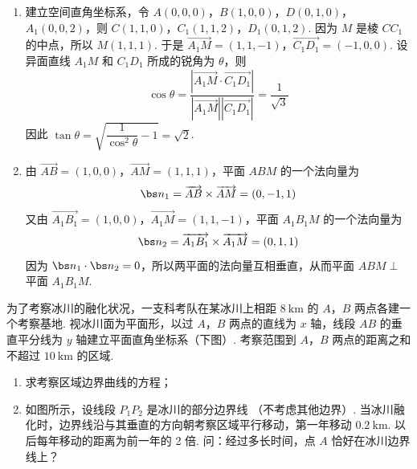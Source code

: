 \begin{solution}
\begin{enumerate}
\item 建立空间直角坐标系，令 \(A(0,0,0)\)，\(B(1,0,0)\)，\(D(0,1,0)\)，\(A_1(0,0,2)\)，则 \(C(1,1,0)\)，\(C_1(1,1,2)\)，\(D_1(0,1,2)\). 因为 \(M\) 是棱 \(CC_1\) 的中点，所以 \(M(1,1,1)\). 于是 \(\overrightarrow{A_1M}=(1,1,-1)\)，\(\overrightarrow{C_1D_1}=(-1,0,0)\). 设异面直线 \(A_1M\) 和 \(C_1D_1\) 所成的锐角为 \(\theta\)，则
\[
\cos\theta=\frac{\left|\overrightarrow{A_1M}\cdot\overrightarrow{C_1D_1}\right|}{\left|\overrightarrow{A_1M}\right|\left|\overrightarrow{C_1D_1}\right|}=\frac{1}{\sqrt{3}}
\]
因此 \(\tan\theta=\sqrt{\dfrac{1}{\cos ^2\theta}-1}=\sqrt{2}\).
\item 由 \(\overrightarrow{AB}=(1,0,0)\)，\(\overrightarrow{AM}=(1,1,1)\)，平面 \(ABM\) 的一个法向量为
\[
\bs n_1=\overrightarrow{AB}\times\overrightarrow{AM}=(0,-1,1)
\]
又由 \(\overrightarrow{A_1B_1}=(1,0,0)\)，\(\overrightarrow{A_1M}=(1,1,-1)\)，平面 \(A_1B_1M\) 的一个法向量为
\[
\bs n_2=\overrightarrow{A_1B_1}\times\overrightarrow{A_1M}=(0,1,1)
\]
因为 \(\bs n_1\cdot\bs n_2=0\)，所以两平面的法向量互相垂直，从而平面 \(ABM\perp\) 平面 \(A_1B_1M\).
\end{enumerate}
\end{solution}

\begin{problem}
为了考察冰川的融化状况，一支科考队在某冰川上相距 \(8 \mathrm{~km}\) 的 \(A\)，\(B\) 两点各建一个考察基地. 视冰川面为平面形，以过 \(A\)，\(B\) 两点的直线为 \(x\) 轴，线段 \(AB\) 的垂直平分线为 \(y\) 轴建立平面直角坐标系（下图）. 考察范围到 \(A\)，\(B\) 两点的距离之和不超过 \(10 \mathrm{~km}\) 的区域.
\begin{enumerate}
\item 求考察区域边界曲线的方程；
\item 如图所示，设线段 \(P_{1}P_{2}\) 是冰川的部分边界线 （不考虑其他边界）. 当冰川融化时，边界线沿与其垂直的方向朝考察区域平行移动，第一年移动 \(0.2 \mathrm{~km}\). 以后每年移动的距离为前一年的 2 倍. 问：经过多长时间，点 \(A\) 恰好在冰川边界线上？
\end{enumerate}
\end{problem}

